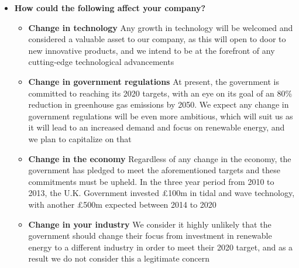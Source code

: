\documentclass[a4paper,11pt]{article}
\begin{document}
\begin{itemize}
	\item \textbf{How could the following affect your company?}
	
	\begin{itemize}
		\item \textbf{Change in technology} Any growth in technology will be welcomed and considered a valuable asset to our company, as this will open to door to new innovative products, and we intend to be at the forefront of any cutting-edge technological advancements
		
		\item \textbf{Change in government regulations} At present, the government is committed to reaching its 2020 targets, with an eye on its goal of an 80\% reduction in greenhouse gas emissions by 2050\cite{f9}. We expect any change in government regulations will be even more ambitious, which will suit us as it will lead to an increased demand and focus on renewable energy, and we plan to capitalize on that
		
		\item \textbf{Change in the economy} Regardless of any change in the economy, the government has pledged to meet the aforementioned targets and these commitments must be upheld. In the three year period from 2010 to 2013, the U.K. Government invested £100m in tidal and wave technology, with another £500m expected between 2014 to 2020\cite{f10}
		
		\item \textbf{Change in your industry} We consider it highly unlikely that the government should change their focus from investment in renewable energy to a different industry in order to meet their 2020 target, and as a result we do not consider this a legitimate concern
	\end{itemize}
\end{itemize}
\end{document}
